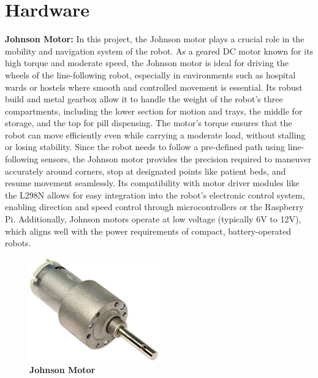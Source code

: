 \section{Hardware}

\textbf{Johnson Motor:} In this project, the Johnson motor plays a crucial role in the mobility and navigation system of the robot. As a geared DC motor known for its high torque and moderate speed, the Johnson motor is ideal for driving the wheels of the line-following robot, especially in environments such as hospital wards or hostels where smooth and controlled movement is essential. Its robust build and metal gearbox allow it to handle the weight of the robot's three compartments, including the lower section for motion and trays, the middle for storage, and the top for pill dispensing. The motor’s torque ensures that the robot can move efficiently even while carrying a moderate load, without stalling or losing stability. Since the robot needs to follow a pre-defined path using line-following sensors, the Johnson motor provides the precision required to maneuver accurately around corners, stop at designated points like patient beds, and resume movement seamlessly. Its compatibility with motor driver modules like the L298N allows for easy integration into the robot’s electronic control system, enabling direction and speed control through microcontrollers or the Raspberry Pi. Additionally, Johnson motors operate at low voltage (typically 6V to 12V), which aligns well with the power requirements of compact, battery-operated robots.

\begin{figure}[htbp!]
\centering
\includegraphics[width=0.5\textwidth,height=0.3\textwidth]{images/3.1.jpg}
\caption{\textbf{Johnson Motor}}
\label{fig:3.1}
\end{figure}

\vspace{1.5\baselineskip} %

